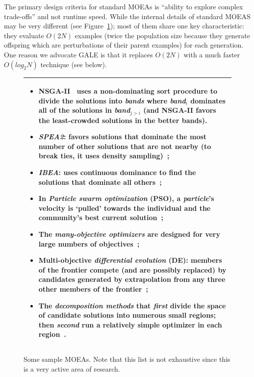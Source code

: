 \documentclass[journal]{IEEEtran}
\newcommand{\bi}{\begin{itemize}}
\newcommand{\ei}{\end{itemize}}
\newcommand{\fig}[1]{Figure~\ref{fig:#1}}
\begin{document}
The primary design criteria for standard MOEAs is ``ability to explore complex trade-offs'' and not runtime speed.
While the internal details of standard MOEAS may be very different (see \fig{sample}); most of them share one key characteristic:
they evaluate $O(2N)$ examples (twice the population size because they generate offspring which are perturbations of their parent examples) for each generation.  One reason we advocate GALE is that it replaces
 $O(2N)$ with a much faster $O(log_2N)$ technique (see below).


\begin{figure}
\begin{tabular}{|p{.95\linewidth}|}\hline
\small
\bi
\item NSGA-II~\cite{deb00afast} 
uses a non-dominating sort procedure to divide the solutions into {\em bands} where {\em band}$_i$ dominates all of the solutions in {\em band}$_{j>i}$ (and NSGA-II favors the
least-crowded solutions in the better bands).
\item
{\em SPEA2}: favors solutions that dominate the most number of other solutions that are not nearby (to break ties, it uses density sampling)~\cite{zit02}; 
\item {\em  IBEA}:
uses continuous dominance to find the solutions that dominate all others~\cite{Zitzler04indicator-basedselection}; 
\item In {\em Particle swarm optimization} (PSO), a {\em particle}'s velocity is `pulled' towards the individual and the community's best current solution~\cite{pan08};
\item 
The {\em many-objective optimizers} are designed for very large numbers of objectives~\cite{deb14}; 
\item
Multi-objective {\em differential evolution} (DE): members of the frontier compete (and are possibly replaced) by candidates generated by extrapolation from any three other members of the frontier~\cite{storn97,5601760};
\item
The {\em decomposition methods} that {\em first} divide the space of candidate solutions into numerous small regions; then {\em second} run a relatively simple optimizer in
each region~\cite{deb05,zhang07}.
\ei \\\hline
\end{tabular}
\caption{Some sample MOEAs. Note that this list is not exhaustive since this is a very active area of research.}\label{fig:sample}
\end{figure}
\end{document}
